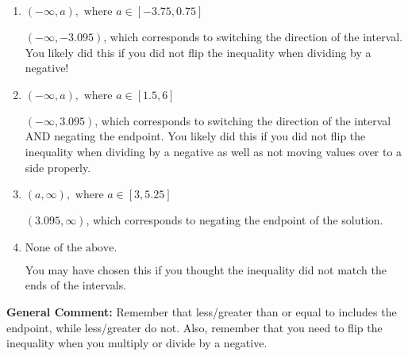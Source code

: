 \documentclass{extbook}[14pt]
\begin{document}
\begin{enumerate}
{\begin{enumerate}[label=\Alph*.]
* $(-3.095, \infty)$, which is the correct option.
\item \( (-\infty, a), \text{ where } a \in [-3.75, 0.75] \)

 $(-\infty, -3.095)$, which corresponds to switching the direction of the interval. You likely did this if you did not flip the inequality when dividing by a negative!
\item \( (-\infty, a), \text{ where } a \in [1.5, 6] \)

 $(-\infty, 3.095)$, which corresponds to switching the direction of the interval AND negating the endpoint. You likely did this if you did not flip the inequality when dividing by a negative as well as not moving values over to a side properly.
\item \( (a, \infty), \text{ where } a \in [3, 5.25] \)

 $(3.095, \infty)$, which corresponds to negating the endpoint of the solution.
\item \( \text{None of the above}. \)

You may have chosen this if you thought the inequality did not match the ends of the intervals.
\end{enumerate}

\textbf{General Comment:} Remember that less/greater than or equal to includes the endpoint, while less/greater do not. Also, remember that you need to flip the inequality when you multiply or divide by a negative.
}
\end{enumerate}
\end{document}
